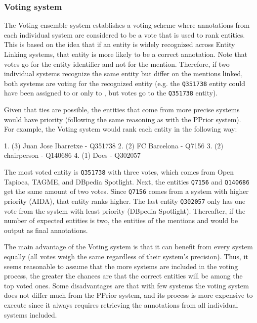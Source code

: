 \subsubsection{Voting system}
\label{cap3:system/entLinModule/ensembleSystems/voting}
The Voting ensemble system establishes a voting scheme where annotations from each individual 
system are considered to be a vote that is used to rank entities. This is based on the idea 
that if an entity is widely recognized across Entity Linking systems, that entity is more 
likely to be a correct annotation. Note that votes go for the entity identifier and not for 
the mention. Therefore, if two individual systems recognize the same entity but differ on the 
mentions linked, both systems are voting for the recognized entity (e.g. the \texttt{Q351738} 
entity could have been assigned to  or only to , 
but votes go to the \texttt{Q351738} entity).

Given that ties are possible, the entities that come from more precise systems would have priority 
(following the same reasoning as with the PPrior system). For example, the Voting system 
would rank each entity in the following way:

\begin{sparqlcode}[]
1. (3) Juan Jose Ibarretxe - Q351738
2. (2) FC Barcelona - Q7156
3. (2) chairperson - Q140686
4. (1) Does - Q302057
\end{sparqlcode}

The most voted entity is \texttt{Q351738} with three votes, which comes from Open Tapioca, TAGME, 
and DBpedia Spotlight. Next, the entities \texttt{Q7156} and \texttt{Q140686} get the same 
amount of two votes. Since \texttt{Q7156} comes from a system with higher priority (AIDA), that 
entity ranks higher. The last entity \texttt{Q302057} only has one vote from the system with 
least priority (DBpedia Spotlight). Thereafter, if the number of expected entities is two, the 
entities of the mentions  and  would be 
output as final annotations.

The main advantage of the Voting system is that it can benefit from every system equally (all 
votes weigh the same regardless of their system’s precision). Thus, it seems reasonable to 
assume that the more systems are included in the voting process, the greater the chances are 
that the correct entities will be among the top voted ones. Some disadvantages are that with 
few systems the voting system does not differ much from the PPrior system, and its process is 
more expensive to execute since it always requires retrieving the annotations from all 
individual systems included.

